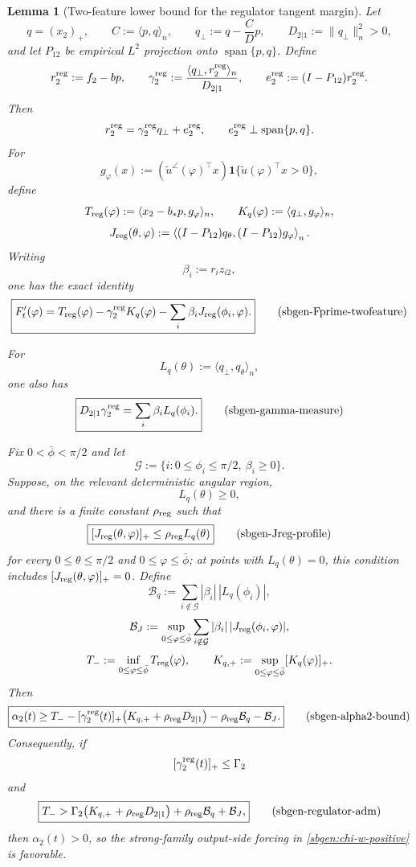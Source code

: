 \documentclass{article} %
\theoremstyle{plain}
\newtheorem{lemma}[theorem]{Lemma}
\theoremstyle{definition}
\theoremstyle{remark}
\begin{document}
\begin{lemma}[Two-feature lower bound for the regulator tangent margin]
\label{sbgen:regulator-transition-kernel}
Let
\[
q=(x_2)_+,
\qquad
C:=\langle p,q\rangle_n,
\qquad
q_\perp:=q-\frac CDp,
\qquad
D_{2|1}:=\|q_\perp\|_n^2>0,
\]
and let $P_{12}$ be empirical $L^2$ projection onto
$\operatorname{span}\{p,q\}$.  Define
\[
r_2^{\rm reg}:=f_2-bp,
\qquad
\gamma_2^{\rm reg}
:=
\frac{\langle q_\perp,r_2^{\rm reg}\rangle_n}{D_{2|1}},
\qquad
e_2^{\rm reg}:=(I-P_{12})r_2^{\rm reg}.
\]
Then
\[
r_2^{\rm reg}=\gamma_2^{\rm reg}q_\perp+e_2^{\rm reg},
\qquad
e_2^{\rm reg}\perp\operatorname{span}\{p,q\}.
\]
For
\[
g_\varphi(x)
:=
(\widetilde u^\angle(\varphi)^\top x)
\mathbf1\{\widetilde u(\varphi)^\top x>0\},
\]
define
\[
T_{\rm reg}(\varphi)
:=
\langle x_2-b_*p,g_\varphi\rangle_n,
\qquad
K_q(\varphi):=\langle q_\perp,g_\varphi\rangle_n,
\]
\[
J_{\rm reg}(\theta,\varphi)
:=
\left\langle
(I-P_{12})q_\theta,
(I-P_{12})g_\varphi
\right\rangle_n.
\]
Writing
\[
\beta_i:=r_i z_{i2},
\]
one has the exact identity
\[
\boxed{
F_t'(\varphi)
=
T_{\rm reg}(\varphi)
-
\gamma_2^{\rm reg}K_q(\varphi)
-
\sum_i\beta_iJ_{\rm reg}(\phi_i,\varphi).
}
\tag{sbgen-Fprime-twofeature}\label{sbgen:Fprime-twofeature}
\]

For
\[
L_q(\theta):=\langle q_\perp,q_\theta\rangle_n,
\]
one also has
\[
\boxed{
D_{2|1}\gamma_2^{\rm reg}
=
\sum_i\beta_iL_q(\phi_i).
}
\tag{sbgen-gamma-measure}\label{sbgen:gamma-measure}
\]

Fix $0<\bar\phi<\pi/2$ and let
\[
\mathcal G
:=
\{i:0\le\phi_i\le\pi/2,\ \beta_i\ge0\}.
\]
Suppose, on the relevant deterministic angular region,
\[
L_q(\theta)\ge0,
\]
and there is a finite constant $\rho_{\rm reg}$ such that
\[
\boxed{
[J_{\rm reg}(\theta,\varphi)]_+
\le
\rho_{\rm reg}L_q(\theta)
}
\tag{sbgen-Jreg-profile}\label{sbgen:Jreg-profile}
\]
for every $0\le\theta\le\pi/2$ and $0\le\varphi\le\bar\phi$; at points with
$L_q(\theta)=0$, this condition includes
$[J_{\rm reg}(\theta,\varphi)]_+=0$.
Define
\[
\mathcal B_q
:=
\sum_{i\notin\mathcal G}
|\beta_i|\,|L_q(\phi_i)|,
\]
\[
\mathcal B_J
:=
\sup_{0\le\varphi\le\bar\phi}
\sum_{i\notin\mathcal G}
|\beta_i|\,|J_{\rm reg}(\phi_i,\varphi)|,
\]
\[
T_-:=\inf_{0\le\varphi\le\bar\phi}T_{\rm reg}(\varphi),
\qquad
K_{q,+}:=\sup_{0\le\varphi\le\bar\phi}[K_q(\varphi)]_+.
\]
Then
\[
\boxed{
\alpha_2(t)
\ge
T_-
-
[\gamma_2^{\rm reg}(t)]_+
\bigl(K_{q,+}+\rho_{\rm reg}D_{2|1}\bigr)
-
\rho_{\rm reg}\mathcal B_q
-
\mathcal B_J.
}
\tag{sbgen-alpha2-bound}\label{sbgen:alpha2-bound}
\]
Consequently, if
\[
[\gamma_2^{\rm reg}(t)]_+\le\Gamma_2
\]
and
\[
\boxed{
T_-
>
\Gamma_2
\bigl(K_{q,+}+\rho_{\rm reg}D_{2|1}\bigr)
+
\rho_{\rm reg}\mathcal B_q
+
\mathcal B_J,
}
\tag{sbgen-regulator-adm}\label{sbgen:regulator-adm}
\]
then $\alpha_2(t)>0$, so the strong-family output-side forcing in
\eqref{sbgen:chi-w-positive} is favorable.
\end{lemma}
\end{document}
